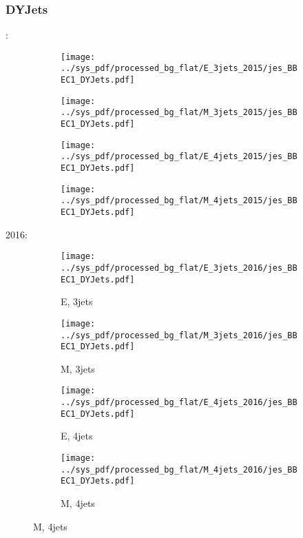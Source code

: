 \documentclass{beamer}
\begin{document}
\begin{frame}
\frametitle{DYJets}
\fontsize{5}{1}:
\begin{figure}
\centering
\begin{subfigure}[b]{0.24\textwidth}
\texttt{[image: ../sys\_pdf/processed\_bg\_flat/E\_3jets\_2015/jes\_BBEC1\_DYJets.pdf]}
\end{subfigure}
\begin{subfigure}[b]{0.24\textwidth}
\texttt{[image: ../sys\_pdf/processed\_bg\_flat/M\_3jets\_2015/jes\_BBEC1\_DYJets.pdf]}
\end{subfigure}
\begin{subfigure}[b]{0.24\textwidth}
\texttt{[image: ../sys\_pdf/processed\_bg\_flat/E\_4jets\_2015/jes\_BBEC1\_DYJets.pdf]}
\end{subfigure}
\begin{subfigure}[b]{0.24\textwidth}
\texttt{[image: ../sys\_pdf/processed\_bg\_flat/M\_4jets\_2015/jes\_BBEC1\_DYJets.pdf]}
\end{subfigure}
\end{figure}
2016:
\begin{figure}
\centering
\begin{subfigure}[b]{0.24\textwidth}
\texttt{[image: ../sys\_pdf/processed\_bg\_flat/E\_3jets\_2016/jes\_BBEC1\_DYJets.pdf]}
\captionsetup{font=tiny}
\caption{E, 3jets}
\end{subfigure}
\begin{subfigure}[b]{0.24\textwidth}
\texttt{[image: ../sys\_pdf/processed\_bg\_flat/M\_3jets\_2016/jes\_BBEC1\_DYJets.pdf]}
\captionsetup{font=tiny}
\caption{M, 3jets}
\end{subfigure}
\begin{subfigure}[b]{0.24\textwidth}
\texttt{[image: ../sys\_pdf/processed\_bg\_flat/E\_4jets\_2016/jes\_BBEC1\_DYJets.pdf]}
\captionsetup{font=tiny}
\caption{E, 4jets}
\end{subfigure}
\begin{subfigure}[b]{0.24\textwidth}
\texttt{[image: ../sys\_pdf/processed\_bg\_flat/M\_4jets\_2016/jes\_BBEC1\_DYJets.pdf]}
\captionsetup{font=tiny}
\caption{M, 4jets}
\end{subfigure}
\end{figure}
\end{frame}
\end{document}
